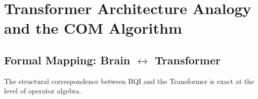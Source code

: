\documentclass[12pt,a4paper]{article}
\theoremstyle{plain}
\theoremstyle{definition}
\theoremstyle{remark}
\begin{document}
\section{Transformer Architecture Analogy and the COM Algorithm}
\label{sec:ai}

\subsection{Formal Mapping: Brain $\leftrightarrow$ Transformer}

The structural correspondence between BQI and the Transformer \citep{Vaswani2017} is exact at the level of operator algebra.

\label{tab:brain_transformer}

\end{document}
